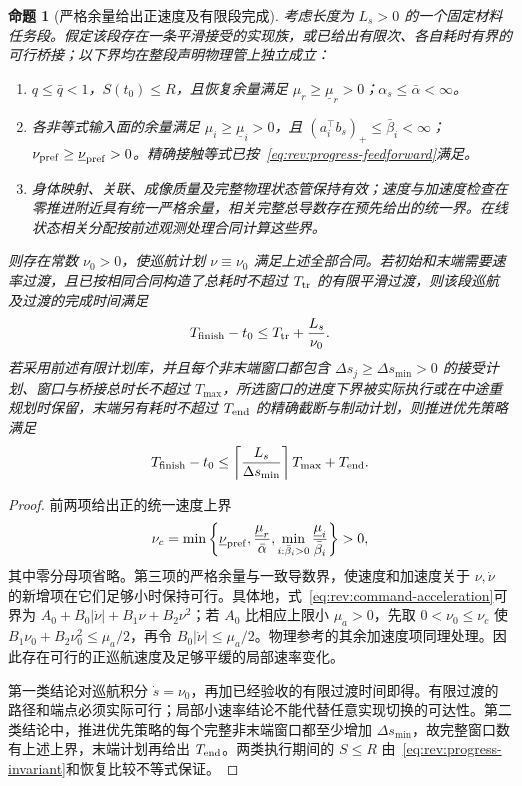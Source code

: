 \documentclass[11pt,a4paper]{article}
\numberwithin{equation}{section}
\newtheorem{proposition}[theorem]{命题}
\theoremstyle{definition}
\begin{document}
\begin{proposition}[严格余量给出正速度及有限段完成]
\label{prop:rev:finite-progress}
考虑长度为 $L_s>0$ 的一个固定材料任务段。假定该段存在一条平滑接受的实现族，或已给出有限次、各自耗时有界的可行桥接；以下界均在整段声明物理管上独立成立：
\begin{enumerate}
 \item $q\le\bar q<1$，$S(t_0)\le R$，且恢复余量满足 $\mu_r\ge\underline\mu_r>0$；$\alpha_s\le\bar\alpha<\infty$。
 \item 各非等式输入面的余量满足 $\mu_i\ge\underline\mu_i>0$，且 $(a_i^\top b_s)_+\le\bar\beta_i<\infty$；$\nu_{\rm pref}\ge\underline{\nu}_{\mathrm{pref}}>0$。精确接触等式已按~\eqref{eq:rev:progress-feedforward}满足。
 \item 身体映射、关联、成像质量及完整物理状态管保持有效；速度与加速度检查在零推进附近具有统一严格余量，相关完整总导数存在预先给出的统一界。在线状态相关分配按前述观测处理合同计算这些界。
\end{enumerate}
则存在常数 $\nu_0>0$，使巡航计划 $\nu\equiv\nu_0$ 满足上述全部合同。若初始和末端需要速率过渡，且已按相同合同构造了总耗时不超过 $T_{\rm tr}$ 的有限平滑过渡，则该段巡航及过渡的完成时间满足
\begin{equation}
 T_{\rm finish}-t_0\le T_{\rm tr}+\frac{L_s}{\nu_0}.
 \label{eq:rev:finite-progress-time}
\end{equation}
若采用前述有限计划库，并且每个非末端窗口都包含 $\Delta s_j\ge\Delta s_{\min}>0$ 的接受计划、窗口与桥接总时长不超过 $T_{\max}$，所选窗口的进度下界被实际执行或在中途重规划时保留，末端另有耗时不超过 $T_{\rm end}$ 的精确截断与制动计划，则推进优先策略满足
\begin{equation}
 T_{\rm finish}-t_0\le
 \left\lceil\frac{L_s}{\Delta s_{\min}}\right\rceil T_{\max}+T_{\rm end}.
 \label{eq:rev:finite-window-progress}
\end{equation}
\end{proposition}
\begin{proof}
前两项给出正的统一速度上界
\[
 \nu_c=\min\left\{\underline\nu_{\rm pref},
 \frac{\underline\mu_r}{\bar\alpha},
 \min_{i:\bar\beta_i>0}\frac{\underline\mu_i}{\bar\beta_i}\right\}>0,
\]
其中零分母项省略。第三项的严格余量与一致导数界，使速度和加速度关于 $\nu,\dot\nu$ 的新增项在它们足够小时保持可行。具体地，式~\eqref{eq:rev:command-acceleration}可界为 $A_0+B_0|\dot\nu|+B_1\nu+B_2\nu^2$；若 $A_0$ 比相应上限小 $\mu_a>0$，先取 $0<\nu_0\le\nu_c$ 使 $B_1\nu_0+B_2\nu_0^2\le\mu_a/2$，再令 $B_0|\dot\nu|\le\mu_a/2$。物理参考的其余加速度项同理处理。因此存在可行的正巡航速度及足够平缓的局部速率变化。

第一类结论对巡航积分 $\dot s=\nu_0$，再加已经验收的有限过渡时间即得。有限过渡的路径和端点必须实际可行；局部小速率结论不能代替任意实现切换的可达性。第二类结论中，推进优先策略的每个完整非末端窗口都至少增加 $\Delta s_{\min}$，故完整窗口数有上述上界，末端计划再给出 $T_{\rm end}$。两类执行期间的 $S\le R$ 由~\eqref{eq:rev:progress-invariant}和恢复比较不等式保证。
\end{proof}
\end{document}
